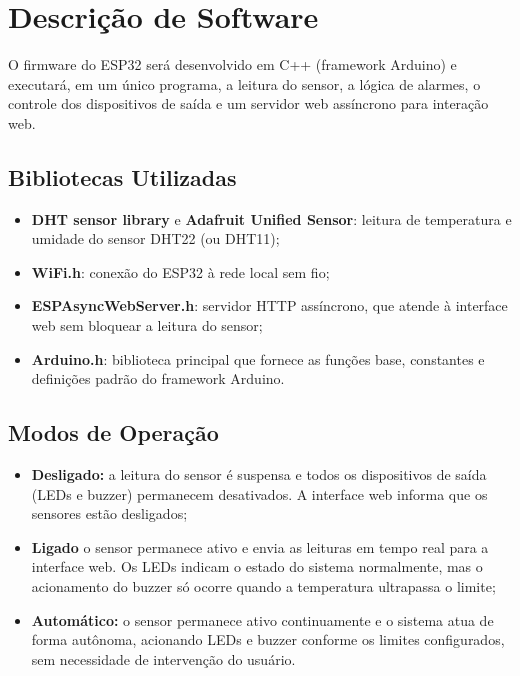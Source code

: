 \section{Descrição de Software}

O firmware do ESP32 será desenvolvido em C++ (framework Arduino) e executará, em um único programa, a leitura do sensor, a lógica de alarmes, o controle dos dispositivos de saída e um servidor web assíncrono para interação web.

\subsection{Bibliotecas Utilizadas}

\begin{itemize}
    \item \textbf{DHT sensor library} e \textbf{Adafruit Unified Sensor}: leitura de temperatura e umidade do sensor DHT22 (ou DHT11);
    \item \textbf{WiFi.h}: conexão do ESP32 à rede local sem fio;
    \item \textbf{ESPAsyncWebServer.h}: servidor HTTP assíncrono, que atende à interface web sem bloquear a leitura do sensor;
    \item \textbf{Arduino.h}: biblioteca principal que fornece as funções base, constantes e definições padrão do framework Arduino.
\end{itemize}

\subsection{Modos de Operação}

\begin{itemize}
    \item \textbf{Desligado:} a leitura do sensor é suspensa e todos os dispositivos de saída (LEDs e buzzer) permanecem desativados. A interface web informa que os sensores estão desligados;
    \item \textbf{Ligado} o sensor permanece ativo e envia as leituras em tempo real para a interface web. Os LEDs indicam o estado do sistema normalmente, mas o acionamento do buzzer só ocorre quando a temperatura ultrapassa o limite;
    \item \textbf{Automático:} o sensor permanece ativo continuamente e o sistema atua de forma autônoma, acionando LEDs e buzzer conforme os limites configurados, sem necessidade de intervenção do usuário.
\end{itemize}

